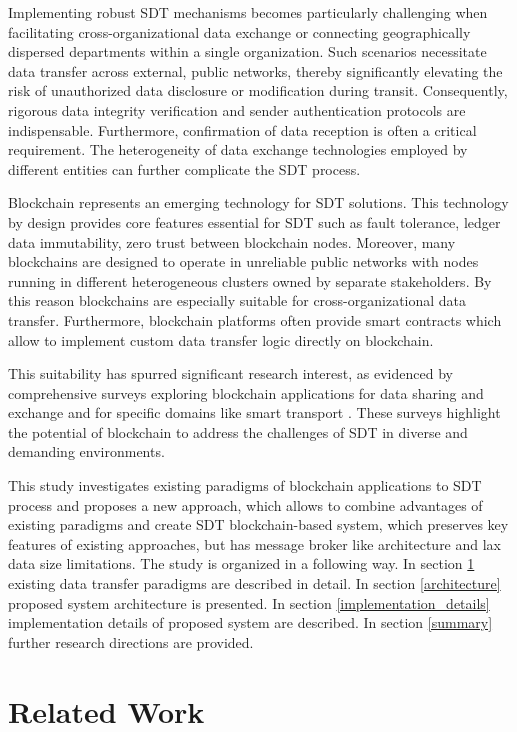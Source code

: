 \documentclass[10pt]{llncs}
\begin{document}
Implementing robust SDT mechanisms becomes particularly challenging when facilitating cross-organizational data exchange or connecting geographically dispersed departments within a single organization. 
Such scenarios necessitate data transfer across external, public networks, thereby significantly elevating the risk of unauthorized data disclosure or modification during transit. 
Consequently, rigorous data integrity verification and sender authentication protocols are indispensable. 
Furthermore, confirmation of data reception is often a critical requirement. 
The heterogeneity of data exchange technologies employed by different entities can further complicate the SDT process.

Blockchain represents an emerging technology for SDT solutions. 
This technology by design provides core features essential for SDT such as fault tolerance, ledger data immutability, zero trust between blockchain nodes.
Moreover, many blockchains are designed to operate in unreliable public networks with nodes running in different heterogeneous clusters owned by separate stakeholders.
By this reason blockchains are especially suitable for cross-organizational data transfer.
Furthermore, blockchain platforms often provide smart contracts which allow to implement custom data transfer logic directly on blockchain.

This suitability has spurred significant research interest, as evidenced by comprehensive surveys exploring blockchain applications for data sharing and exchange \cite{Song2023} and for specific domains like smart transport \cite{Bagga2022}.
These surveys highlight the potential of blockchain to address the challenges of SDT in diverse and demanding environments.

This study investigates existing paradigms of blockchain applications to SDT process and proposes a new approach, which allows to combine advantages of existing paradigms and create 
SDT blockchain-based system, which preserves key features of existing approaches, but has message broker like architecture and lax data size limitations.
The study is organized in a following way. 
In section \ref{related_work} existing data transfer paradigms are described in detail.
In section \ref{architecture} proposed system architecture is presented.
In section \ref{implementation_details} implementation details of proposed system are described.
In section \ref{summary} further research directions are provided.

\section{Related Work} \label{related_work}
\end{document}
